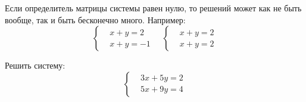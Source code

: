 \documentclass[a4paper,12pt]{article}
\begin{document}
  
  \begin{example}
    Если определитель матрицы системы равен нулю, то решений может как не быть вообще, так и быть бесконечно много.
    Например:
    \[
      \left\{
        \begin{aligned}
          &x + y = 2\\
          &x + y = -1
        \end{aligned}
      \right.
      \quad \left\{
        \begin{aligned}
          &x + y = 2\\
          &x + y = 2
        \end{aligned}
      \right.
    \]
  \end{example}
  
  
  \begin{problem}[17.1(2)]
    Решить систему:
    \[
      \left\{
        \begin{aligned}
          &3x + 5y = 2\\
          &5x + 9y = 4
        \end{aligned}
      \right.
    \]
  \end{problem}
  
\end{document}
